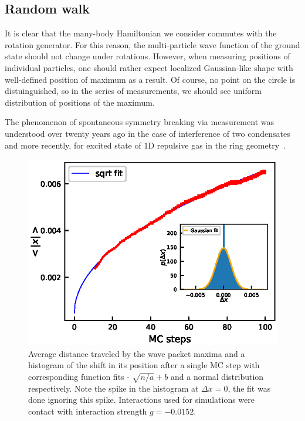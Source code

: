 \documentclass[aps,pra,reprint]{revtex4-2}
\begin{document}
\subsection{Random walk}
It is clear that the many-body Hamiltonian we consider commutes with the 
rotation generator. For this reason, the multi-particle wave function of the 
ground state should not change under rotations. However, when measuring 
positions of individual particles, one should rather expect localized 
Gaussian-like shape with well-defined position of maximum as a result. Of 
course, no point on the circle is distuinguished, so in the series of 
measurements, we should see uniform distribution of positions of the maximum.
    
The phenomenon of spontaneous symmetry breaking via measurement was understood 
over twenty years ago in the case of interference of two condensates
~\cite{Javanainen1996,Andrews1997} and more recently, for excited state of 1D 
repulsive gas in the ring geometry~\cite{Syrwid2015}.
\begin{figure}[h]
\includegraphics{fig5.eps}
\caption{Average distance traveled by the wave packet maxima and a histogram of 
the shift in its position after a single MC step with corresponding function 
fits - $\sqrt{n/a}+b$ and a normal distribution respectively. Note the spike 
in the histogram at $\Delta x=0$, the fit was done ignoring this spike. 
Interactions used for simulations were contact with interaction strength 
$g=-0.0152$.}
\label{fig:randomwalk}
\end{figure}
    
\end{document}
